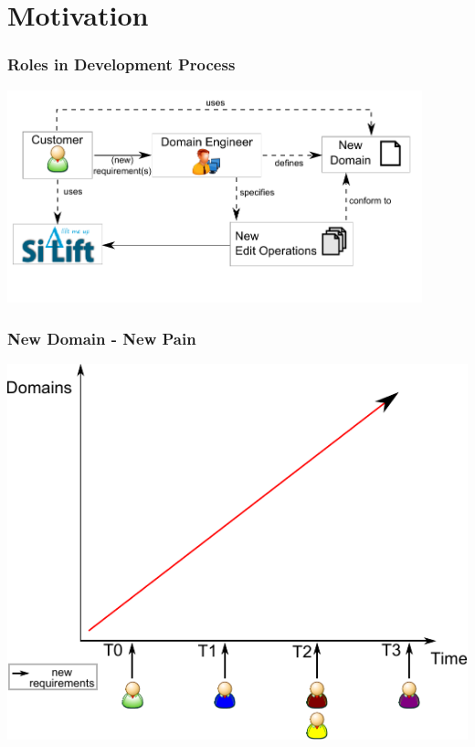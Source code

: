 \section{Motivation}

\begin{frame}
\frametitle{Roles in Development Process}
\begin{center}
\includegraphics[width=0.9\textwidth]{images/overview}
  \end{center}
\end{frame}
\begin{frame}
\frametitle{New Domain - New Pain}
\begin{center}
\includegraphics[scale=0.8]{images/motivation}
  \end{center}
\end{frame}
